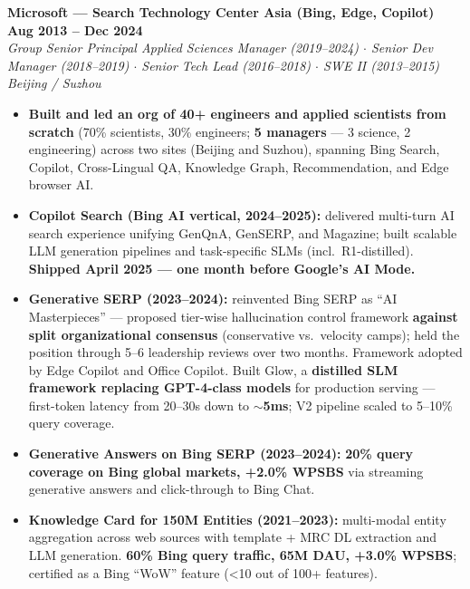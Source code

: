\documentclass[10.5pt,letterpaper]{article}
\newcommand{\role}[4]{%
  \noindent\textbf{#1} \hfill \textbf{#3}\\
  \textit{#2} \hfill \textit{#4}\par\vspace{2pt}}
\begin{document}
\vspace{4pt}
\role{Microsoft --- Search Technology Center Asia (Bing, Edge, Copilot)}{Group Senior Principal Applied Sciences Manager (2019--2024) $\cdot$ Senior Dev Manager (2018--2019) $\cdot$ Senior Tech Lead (2016--2018) $\cdot$ SWE II (2013--2015)}{Aug 2013 -- Dec 2024}{Beijing / Suzhou}
\begin{itemize}
  \item \textbf{Built and led an org of 40+ engineers and applied scientists from scratch} (70\% scientists, 30\% engineers; \textbf{5 managers} — 3 science, 2 engineering) across two sites (Beijing and Suzhou), spanning Bing Search, Copilot, Cross-Lingual QA, Knowledge Graph, Recommendation, and Edge browser AI.
  \item \textbf{Copilot Search (Bing AI vertical, 2024--2025):} delivered multi-turn AI search experience unifying GenQnA, GenSERP, and Magazine; built scalable LLM generation pipelines and task-specific SLMs (incl.\ R1-distilled). \textbf{Shipped April 2025 — one month before Google's AI Mode.}
  \item \textbf{Generative SERP (2023--2024):} reinvented Bing SERP as ``AI Masterpieces'' — proposed tier-wise hallucination control framework \textbf{against split organizational consensus} (conservative vs.\ velocity camps); held the position through 5--6 leadership reviews over two months. Framework adopted by Edge Copilot and Office Copilot. Built Glow, a \textbf{distilled SLM framework replacing GPT-4-class models} for production serving — first-token latency from 20--30s down to \textbf{$\sim$5ms}; V2 pipeline scaled to 5--10\% query coverage.
  \item \textbf{Generative Answers on Bing SERP (2023--2024):} \textbf{20\% query coverage on Bing global markets, +2.0\% WPSBS} via streaming generative answers and click-through to Bing Chat.
  \item \textbf{Knowledge Card for 150M Entities (2021--2023):} multi-modal entity aggregation across web sources with template + MRC DL extraction and LLM generation. \textbf{60\% Bing query traffic, 65M DAU, +3.0\% WPSBS}; certified as a Bing ``WoW'' feature (<10 out of 100+ features).

\end{itemize}
\end{document}
